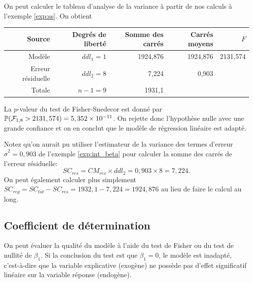 \newpage
\begin{exemple}
On peut calculer le tableau d'analyse de la variance à partir de nos calculs à l'exemple \ref{exp:ss}. On obtient


\begin{table}[htb!]
\centering
\begin{small}
\begin{tabular}{|r|r|r|r|r|}\hline
Source & Degrés de liberté & Somme des carrés & Carrés moyens & $F$ \\ \hline
Modèle & $ddl_1=1$ & 1924,876 & 1924,876   & 2131,574 \\ \hline
Erreur résiduelle & $ddl_2=8$ &  7,224 & 0,903 & \\ \hline
Totale & $n-1=9$ & 1931,1&  & \\ \hline
\end{tabular}
\end{small}
\label{tab:tabanova_exp}
\end{table}

La $p$-valeur du test de Fisher-Snedecor est donné par $\mathbb{P}(\mathcal{F}_{1,8}>2131,574)=5,352\times 10^{-11}$. On rejette donc l'hypothèse nulle avec une grande confiance et on en conclut que le modèle de régression linéaire est adapté.

Notez qu'on aurait pu utiliser l'estimateur de la variance des termes d'erreur $\hat\sigma^2=0,903$ de l'exemple \ref{exp:int_beta} pour calculer la somme des carrés de l'erreur résiduelle:
$$SC_{res}=CM_{res}\times ddl_2=0,903\times 8=7,224.$$ On peut également calculer plus simplement $SC_{reg}=SC_{tot}-SC_{res}=1932,1-7,224=1924,876$ au lieu de faire le calcul au long.

\end{exemple}


\subsection{Coefficient de détermination}
\label{sec:R2}

On peut évaluer la qualité du modèle à l'aide du test de Fisher ou du test de nullité de $\beta_1$. Si la conclusion du test est que $\beta_1 = 0$, le modèle est inadapté, c'est-à-dire que la variable explicative (exogène) ne possède pas d'effet significatif linéaire sur la variable réponse (endogène).

